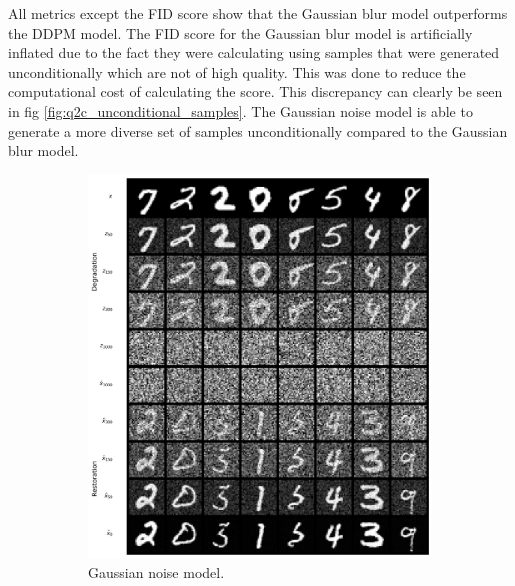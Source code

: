 \documentclass[11pt]{article}
\begin{document}
All metrics except the FID score show that the Gaussian blur model outperforms the DDPM model. The FID score for the Gaussian blur model is artificially inflated due to the fact they were calculating using samples that were generated unconditionally which are not of high quality. This was done to reduce the computational cost of calculating the score. This discrepancy can clearly be seen in fig \ref{fig:q2c_unconditional_samples}. The Gaussian noise model is able to generate a more diverse set of samples unconditionally compared to the Gaussian blur model.
\begin{figure}[ht]
    \centering
    \begin{subfigure}{.4\textwidth}
        \centering
        \includegraphics[width=0.9\linewidth]{figs/q2c_ddpm_cond_samples_norm_8.png}
        \caption{Gaussian noise model.}
        \label{fig:cond_ddpm}
    \end{subfigure}%
    \hfill
    \begin{subfigure}{.4\textwidth}
        \centering

\end{subfigure}
\end{figure}
\end{document}
